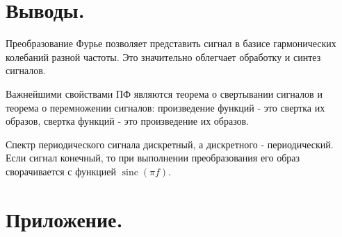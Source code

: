 \documentclass[a4paper,14pt]{extarticle}
\DeclareMathOperator{\sinc}{sinc}
\begin{document}
\section{Выводы.}

Преобразование Фурье позволяет представить сигнал в базисе гармонических колебаний разной частоты. Это значительно облегчает обработку и синтез сигналов.

Важнейшими свойствами ПФ являются теорема о свертывании сигналов и теорема о перемножении сигналов: произведение функций - это свертка их образов, свертка функций - это произведение их образов.

Спектр периодического сигнала дискретный, а дискретного - периодический. Если сигнал конечный, то при выполнении преобразования его образ сворачивается с функцией $\sinc(\pi f)$. 

\section{Приложение.}


\end{document}
